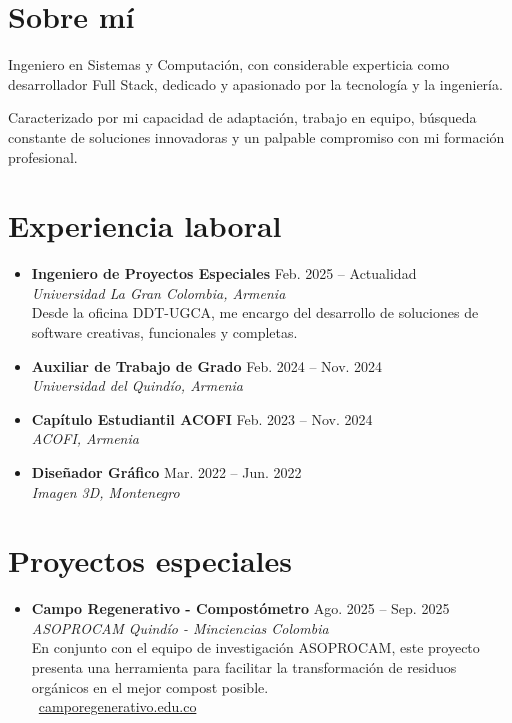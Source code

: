 \documentclass[11pt,a4paper]{article}
\begin{document}
\begin{minipage}[t]{0.72\textwidth}
\raggedright

\section*{Sobre mí}
Ingeniero en Sistemas y Computación, con considerable experticia como desarrollador Full Stack, dedicado y apasionado por la tecnología y la ingeniería.

Caracterizado por mi capacidad de adaptación, trabajo en equipo, búsqueda constante de soluciones innovadoras y un palpable compromiso con mi formación profesional.
\\[12pt]

\section*{Experiencia laboral}
\begin{itemize}
\item \textbf{Ingeniero de Proyectos Especiales} \hfill Feb. 2025 -- Actualidad\\
\textit{Universidad La Gran Colombia, Armenia}\\
Desde la oficina DDT-UGCA, me encargo del desarrollo de soluciones de software creativas, funcionales y completas.
\\[6pt]
\item \textbf{Auxiliar de Trabajo de Grado} \hfill Feb. 2024 -- Nov. 2024\\
\textit{Universidad del Quindío, Armenia}\\[6pt]
\item \textbf{Capítulo Estudiantil ACOFI} \hfill Feb. 2023 -- Nov. 2024\\
\textit{ACOFI, Armenia}\\[6pt]
\item \textbf{Diseñador Gráfico} \hfill Mar. 2022 -- Jun. 2022\\
\textit{Imagen 3D, Montenegro}\\
\end{itemize}

\section*{Proyectos especiales}
\begin{itemize}
\item \textbf{Campo Regenerativo - Compostómetro} \hfill Ago. 2025 -- Sep. 2025\\
\textit{ASOPROCAM Quindío - Minciencias Colombia}\\
En conjunto con el equipo de investigación ASOPROCAM, este proyecto presenta una herramienta para facilitar la transformación de residuos orgánicos en el mejor compost posible.\\
\
\href{https://camporegenerativo.edu.co/}{camporegenerativo.edu.co}
\end{itemize}
\end{minipage}
\end{document}
